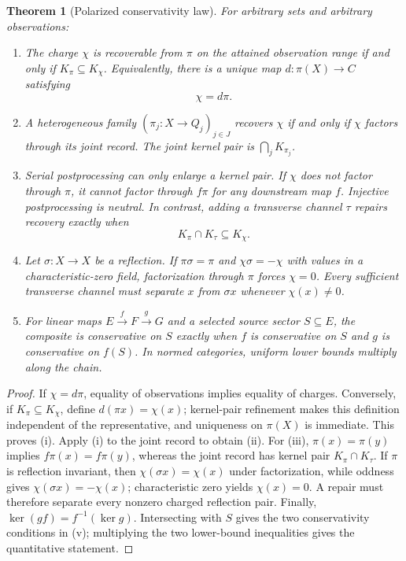 \documentclass[11pt]{article}
\newtheorem{theorem}{Theorem}[section]
\theoremstyle{definition}
\theoremstyle{remark}
\begin{document}
\begin{theorem}[Polarized conservativity law]
\label{thm:resolved-test}
For arbitrary sets and arbitrary observations:
\begin{enumerate}[label=\textup{(\roman*)},leftmargin=2.2em]
\item The charge \(\chi\) is recoverable from \(\pi\) on the attained
      observation range if and only if \(K_\pi\subseteq K_\chi\).
      Equivalently, there is a unique map
      \(d:\pi(X)\to C\) satisfying
      \[
                             \chi=d\pi.
      \tag{2.0a}\label{eq:polarized-factor}
      \]
\item A heterogeneous family \((\pi_j:X\to Q_j)_{j\in J}\) recovers
      \(\chi\) if and only if \(\chi\) factors through its joint record.
      The joint kernel pair is \(\bigcap_jK_{\pi_j}\).
\item Serial postprocessing can only enlarge a kernel pair.  If \(\chi\)
      does not factor through \(\pi\), it cannot factor through
      \(f\pi\) for any downstream map \(f\).  Injective postprocessing is
      neutral.  In contrast, adding a transverse channel \(\tau\) repairs
      recovery exactly when
      \[
                       K_\pi\cap K_\tau\subseteq K_\chi.
      \tag{2.0b}\label{eq:transverse-repair}
      \]
\item Let \(\sigma:X\to X\) be a reflection.  If \(\pi\sigma=\pi\) and
      \(\chi\sigma=-\chi\) with values in a characteristic-zero field,
      factorization through \(\pi\) forces \(\chi=0\).  Every sufficient
      transverse channel must separate \(x\) from \(\sigma x\) whenever
      \(\chi(x)\ne0\).
\item For linear maps \(E\xrightarrow{f}F\xrightarrow{g}G\) and a selected
      source sector \(S\subseteq E\), the composite is conservative on
      \(S\) exactly when \(f\) is conservative on \(S\) and \(g\) is
      conservative on \(f(S)\).  In normed categories, uniform lower bounds
      multiply along the chain.
\end{enumerate}
\end{theorem}

\begin{proof}
If \(\chi=d\pi\), equality of observations implies equality of charges.
Conversely, if \(K_\pi\subseteq K_\chi\), define
\(d(\pi x)=\chi(x)\); kernel-pair refinement makes this definition
independent of the representative, and uniqueness on \(\pi(X)\) is
immediate.  This proves (i).  Apply (i) to the joint record to obtain (ii).
For (iii), \(\pi(x)=\pi(y)\) implies
\(f\pi(x)=f\pi(y)\), whereas the joint record has kernel pair
\(K_\pi\cap K_\tau\).  If \(\pi\) is reflection invariant, then
\(\chi(\sigma x)=\chi(x)\) under factorization, while oddness gives
\(\chi(\sigma x)=-\chi(x)\); characteristic zero yields \(\chi(x)=0\).
A repair must therefore separate every nonzero charged reflection pair.
Finally,
\(\ker(gf)=f^{-1}(\ker g)\).  Intersecting with \(S\) gives the two
conservativity conditions in (v); multiplying the two lower-bound
inequalities gives the quantitative statement.
\end{proof}
\end{document}
